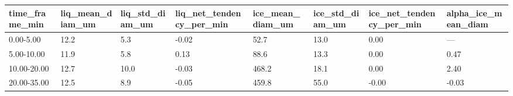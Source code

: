 \begin{tabular}{llllllll}
\toprule
time_frame_min & liq_mean_diam_um & liq_std_diam_um & liq_net_tendency_per_min & ice_mean_diam_um & ice_std_diam_um & ice_net_tendency_per_min & alpha_ice_mean_diam \\
\midrule
0.00-5.00 & 12.2 & 5.3 & -0.02 & 52.7 & 13.0 & 0.00 & — \\
5.00-10.00 & 11.9 & 5.8 & 0.13 & 88.6 & 13.3 & 0.00 & 0.47 \\
10.00-20.00 & 12.7 & 10.0 & -0.03 & 468.2 & 18.1 & 0.00 & 2.40 \\
20.00-35.00 & 12.5 & 8.9 & -0.05 & 459.8 & 55.0 & -0.00 & -0.03 \\
\bottomrule
\end{tabular}
